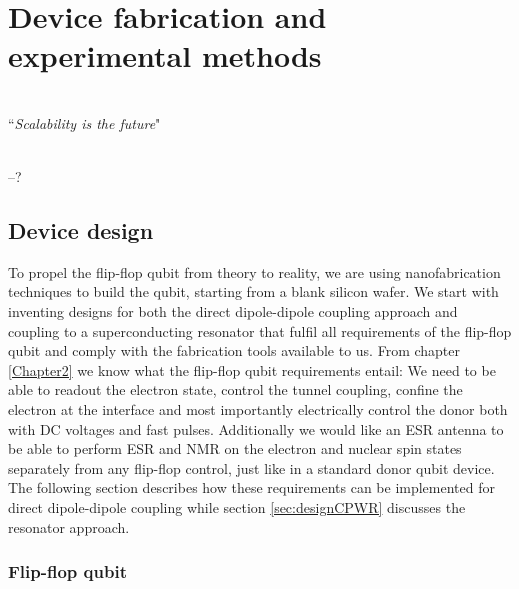
\chapter{Device fabrication and experimental methods} %

\label{Chapter5} 

\HRule
\vspace{0.5cm} \hspace{2cm}
\small
\hangindent=4cm
\\
        ``\emph{Scalability is the future}"
\\ \\
\hangindent=4cm
\begin{flushright}
--? \\
\end{flushright}

\vspace{0.5cm}

\noindent \HRule
\clearpage

\section{Device design} \label{sec:deviceDesign}

To propel the flip-flop qubit from theory to reality, we are using nanofabrication techniques to build the qubit, starting from a blank silicon wafer. We start with inventing designs for both the direct dipole-dipole coupling approach and coupling to a superconducting resonator that fulfil all requirements of the flip-flop qubit and comply with the fabrication tools available to us. 
From chapter \ref{Chapter2} we know what the flip-flop qubit requirements entail: We need to be able to readout the electron state, control the tunnel coupling, confine the electron at the interface and most importantly electrically control the donor both with DC voltages and fast pulses.
Additionally we would like an ESR antenna to be able to perform ESR and NMR on the electron and nuclear spin states separately from any flip-flop control, just like in a standard donor qubit device.  The following section describes how these requirements can be implemented for direct dipole-dipole coupling while section \ref{sec:designCPWR} discusses the resonator approach. 

\subsection{Flip-flop qubit} \label{sec:designFF}

